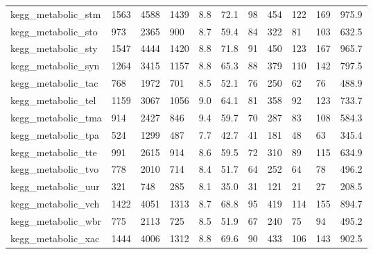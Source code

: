 \begin{longtable}{lllllllllll}
 kegg\_metabolic\_stm                                 & 1563       & 4588      & 1439  & 8.8    & 72.1   & 98    & 454    & 122    & 169    & 975.9   \\
 kegg\_metabolic\_sto                                 & 973        & 2365      & 900   & 8.7    & 59.4   & 84    & 322    & 81     & 103    & 632.5   \\
 kegg\_metabolic\_sty                                 & 1547       & 4444      & 1420  & 8.8    & 71.8   & 91    & 450    & 123    & 167    & 965.7   \\
 kegg\_metabolic\_syn                                 & 1264       & 3415      & 1157  & 8.8    & 65.3   & 88    & 379    & 110    & 142    & 797.5   \\
 kegg\_metabolic\_tac                                 & 768        & 1972      & 701   & 8.5    & 52.1   & 76    & 250    & 62     & 76     & 488.9   \\
 kegg\_metabolic\_tel                                 & 1159       & 3067      & 1056  & 9.0    & 64.1   & 81    & 358    & 92     & 123    & 733.7   \\
 kegg\_metabolic\_tma                                 & 914        & 2427      & 846   & 9.4    & 59.7   & 70    & 287    & 83     & 108    & 584.3   \\
 kegg\_metabolic\_tpa                                 & 524        & 1299      & 487   & 7.7    & 42.7   & 41    & 181    & 48     & 63     & 345.4   \\
 kegg\_metabolic\_tte                                 & 991        & 2615      & 914   & 8.6    & 59.5   & 72    & 310    & 89     & 115    & 634.9   \\
 kegg\_metabolic\_tvo                                 & 778        & 2010      & 714   & 8.4    & 51.7   & 64    & 252    & 64     & 78     & 496.2   \\
 kegg\_metabolic\_uur                                 & 321        & 748       & 285   & 8.1    & 35.0   & 31    & 121    & 21     & 27     & 208.5   \\
 kegg\_metabolic\_vch                                 & 1422       & 4051      & 1313  & 8.7    & 68.8   & 95    & 419    & 114    & 155    & 894.7   \\
 kegg\_metabolic\_wbr                                 & 775        & 2113      & 725   & 8.5    & 51.9   & 67    & 240    & 75     & 94     & 495.2   \\
 kegg\_metabolic\_xac                                 & 1444       & 4006      & 1312  & 8.8    & 69.6   & 90    & 433    & 106    & 143    & 902.5   \\

\end{longtable}

